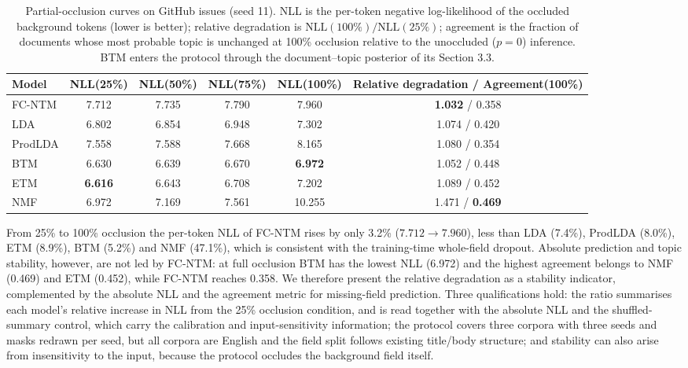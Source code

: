 \documentclass[Journal,letterpaper]{ascelike-new}
\newcommand{\fcntm}{FC-NTM}
\begin{document}
\begin{table}[t]
\centering
\caption{Partial-occlusion curves on GitHub issues (seed 11). NLL is the per-token negative log-likelihood of the occluded background tokens (lower is better); relative degradation is $\mathrm{NLL}(100\%)/\mathrm{NLL}(25\%)$; agreement is the fraction of documents whose most probable topic is unchanged at 100\% occlusion relative to the unoccluded ($p=0$) inference. BTM enters the protocol through the document--topic posterior of its Section 3.3.}
\label{tab:occl-robust}
\small
\setlength{\tabcolsep}{4pt}
\begin{tabular}{@{}lccccc@{}}
\toprule
Model & NLL(25\%) & NLL(50\%) & NLL(75\%) & NLL(100\%) & Relative degradation / Agreement(100\%) \\
\midrule
\fcntm{} & 7.712 & 7.735 & 7.790 & 7.960 & \textbf{1.032} / 0.358 \\
LDA & 6.802 & 6.854 & 6.948 & 7.302 & 1.074 / 0.420 \\
ProdLDA & 7.558 & 7.588 & 7.668 & 8.165 & 1.080 / 0.354 \\
BTM & 6.630 & 6.639 & 6.670 & \textbf{6.972} & 1.052 / 0.448 \\
ETM & \textbf{6.616} & 6.643 & 6.708 & 7.202 & 1.089 / 0.452 \\
NMF & 6.972 & 7.169 & 7.561 & 10.255 & 1.471 / \textbf{0.469} \\
\bottomrule
\end{tabular}
\end{table}

From 25\% to 100\% occlusion the per-token NLL of \fcntm{} rises by only 3.2\% ($7.712\to7.960$),
less than LDA (7.4\%), ProdLDA (8.0\%), ETM (8.9\%), BTM (5.2\%) and NMF (47.1\%), which is
consistent with the training-time whole-field dropout. Absolute prediction and topic stability,
however, are not led by \fcntm{}: at full occlusion BTM has the lowest NLL (6.972) and the highest
agreement belongs to NMF (0.469) and ETM (0.452), while \fcntm{} reaches 0.358. We therefore present the relative degradation as a stability indicator, complemented by the absolute NLL and the agreement metric for missing-field prediction. Three qualifications
hold: the ratio summarises each model's relative increase in NLL from the 25\% occlusion condition, and is read together with the absolute NLL and the shuffled-summary control, which carry the calibration and input-sensitivity information; the protocol covers three corpora with three seeds and masks redrawn
per seed, but all corpora are English and the field split follows existing title/body structure; and
stability can also arise from insensitivity to the input, because the protocol occludes the
background field itself.
\end{document}
